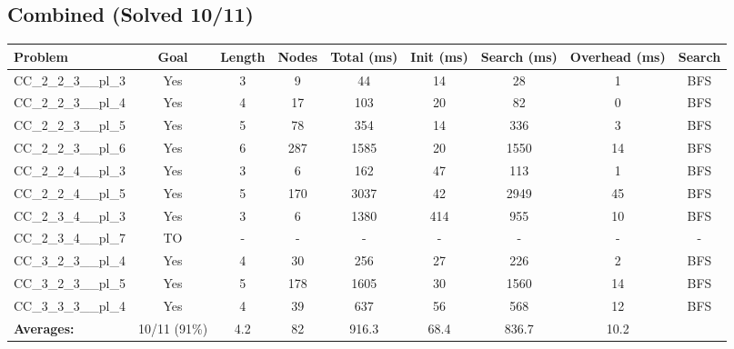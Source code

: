 \documentclass{article}
\begin{document}
\subsection*{Combined (Solved 10/11)}
\begin{tabular}{lcccccccc}
\toprule
Problem & Goal & Length & Nodes & Total (ms) & Init (ms) & Search (ms) & Overhead (ms) & Search \\
\midrule
CC\_2\_2\_3\_\_pl\_3 & Yes & 3 & 9 & 44 & 14 & 28 & 1 & BFS \\
CC\_2\_2\_3\_\_pl\_4 & Yes & 4 & 17 & 103 & 20 & 82 & 0 & BFS \\
CC\_2\_2\_3\_\_pl\_5 & Yes & 5 & 78 & 354 & 14 & 336 & 3 & BFS \\
CC\_2\_2\_3\_\_pl\_6 & Yes & 6 & 287 & 1585 & 20 & 1550 & 14 & BFS \\
CC\_2\_2\_4\_\_pl\_3 & Yes & 3 & 6 & 162 & 47 & 113 & 1 & BFS \\
CC\_2\_2\_4\_\_pl\_5 & Yes & 5 & 170 & 3037 & 42 & 2949 & 45 & BFS \\
CC\_2\_3\_4\_\_pl\_3 & Yes & 3 & 6 & 1380 & 414 & 955 & 10 & BFS \\
CC\_2\_3\_4\_\_pl\_7 & TO & - & - & - & - & - & - & - \\
CC\_3\_2\_3\_\_pl\_4 & Yes & 4 & 30 & 256 & 27 & 226 & 2 & BFS \\
CC\_3\_2\_3\_\_pl\_5 & Yes & 5 & 178 & 1605 & 30 & 1560 & 14 & BFS \\
CC\_3\_3\_3\_\_pl\_4 & Yes & 4 & 39 & 637 & 56 & 568 & 12 & BFS \\
\textbf{Averages:} & 10/11 (91\%) & 4.2 & 82 & 916.3 & 68.4 & 836.7 & 10.2 & \\
\bottomrule
\end{tabular}
\\[0.7cm]
\end{document}
